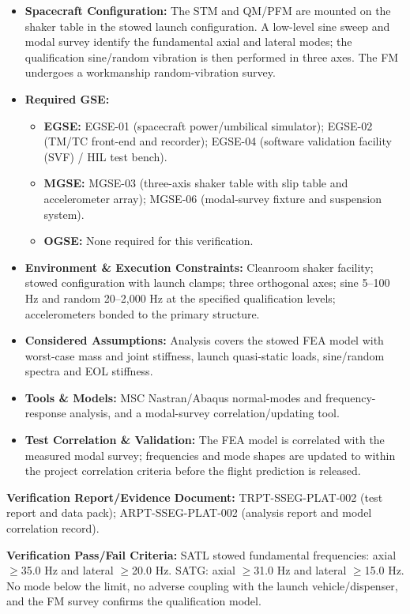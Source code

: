 \begin{itemize}
\item \textbf{Spacecraft Configuration:} The STM and QM/PFM are mounted on the shaker table in the stowed launch configuration. A low-level sine sweep and modal survey identify the fundamental axial and lateral modes; the qualification sine/random vibration is then performed in three axes. The FM undergoes a workmanship random-vibration survey.
\item \textbf{Required GSE:}
\begin{itemize}
\item \textbf{EGSE:} EGSE-01 (spacecraft power/umbilical simulator); EGSE-02 (TM/TC front-end and recorder); EGSE-04 (software validation facility (SVF) / HIL test bench).
\item \textbf{MGSE:} MGSE-03 (three-axis shaker table with slip table and accelerometer array); MGSE-06 (modal-survey fixture and suspension system).
\item \textbf{OGSE:} None required for this verification.
\end{itemize}
\item \textbf{Environment \& Execution Constraints:} Cleanroom shaker facility; stowed configuration with launch clamps; three orthogonal axes; sine 5--100 Hz and random 20--2,000 Hz at the specified qualification levels; accelerometers bonded to the primary structure.
\item \textbf{Considered Assumptions:} Analysis covers the stowed FEA model with worst-case mass and joint stiffness, launch quasi-static loads, sine/random spectra and EOL stiffness.
\item \textbf{Tools \& Models:} MSC Nastran/Abaqus normal-modes and frequency-response analysis, and a modal-survey correlation/updating tool.
\item \textbf{Test Correlation \& Validation:} The FEA model is correlated with the measured modal survey; frequencies and mode shapes are updated to within the project correlation criteria before the flight prediction is released.
\end{itemize}
\par\textbf{Verification Report/Evidence Document:} TRPT-SSEG-PLAT-002 (test report and data pack); ARPT-SSEG-PLAT-002 (analysis report and model correlation record).
\par\textbf{Verification Pass/Fail Criteria:} SATL stowed fundamental frequencies: axial $\ge$35.0 Hz and lateral $\ge$20.0 Hz. SATG: axial $\ge$31.0 Hz and lateral $\ge$15.0 Hz. No mode below the limit, no adverse coupling with the launch vehicle/dispenser, and the FM survey confirms the qualification model.
\par\medskip
